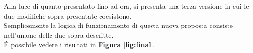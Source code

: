 Alla luce di quanto presentato fino ad ora, si presenta una terza versione in cui le due modifiche sopra presentate coesistono. \\
Semplicemente la logica di funzionamento di questa nuova proposta consiste nell'unione delle due sopra descritte.\\
\'E possibile vedere i risultati in \textbf{Figura \ref{fig:final}}.\\